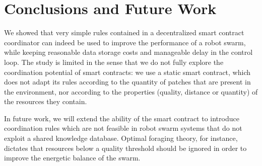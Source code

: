 \documentclass[runningheads]{llncs}
\begin{document}

\section{Conclusions and Future Work}
\label{sec:conclusion}

We showed that very simple rules contained in a decentralized smart contract coordinator can indeed be used to improve the performance of a robot swarm, while keeping reasonable data storage costs and manageable delay in the control loop. The study is limited in the sense that we do not fully explore the coordination potential of smart contracts: we use a static smart contract, which does not adapt its rules according to the quantity of patches that are present in the environment, nor according to the properties (quality, distance or quantity) of the resources they contain.

In future work, we will extend the ability of the smart contract to introduce coordination rules which are not feasible in robot swarm systems that do not exploit a shared knowledge database. Optimal foraging theory, for instance, dictates that resources below a quality threshold should be ignored in order to improve the energetic balance of the swarm. 






\end{document}
